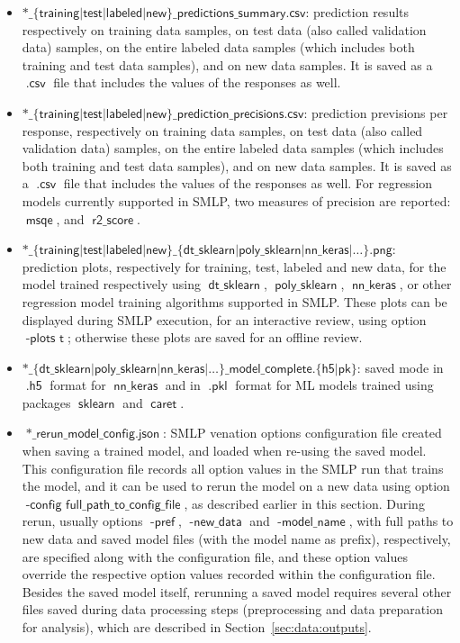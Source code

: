 \documentclass[a4paper,parskip=half]{article} %
\newcommand*\option[1]{\operatorname{\mathsf{#1}}} %
\newcommand*\suffix[1]{\operatorname{\mathsf{#1}}} %
\newcommand*\package[1]{\operatorname{\mathsf{#1}}} %
\newcommand*\precision[1]{\operatorname{\mathsf{#1}}} %
\newcommand*\model[1]{\operatorname{\mathsf{#1}}} %
\begin{document}
\begin{itemize}
\item $\suffix{*\_\{training|test|labeled|new\}\_predictions\_summary.csv}$: prediction results respectively on 
training data samples, on test data (also called validation data) samples, on the entire labeled data samples
(which includes both training and test data samples), and on new data samples. It is saved as a $\suffix{.csv}$ 
file that includes the values of the responses as well.
\item $\suffix{*\_\{training|test|labeled|new\}\_prediction\_precisions.csv}$: prediction previsions per response, 
respectively on 
training data samples, on test data (also called validation data) samples, on the entire labeled data samples
(which includes both training and test data samples), and on new data samples. It is saved as a $\suffix{.csv}$ 
file that includes the values of the responses as well. For regression models currently supported in SMLP, 
 two measures of precision are reported: $\precision{msqe}$, and $\precision{r2\_score}$.
\item $\suffix{*\_\{training|test|labeled|new\}\_\{dt\_sklearn|poly\_sklearn|nn\_keras|\ldots\}.png}$: prediction plots,
respectively for training, test, labeled and new data, for the model trained respectively using 
$\model{dt\_sklearn}$, $\model{poly\_sklearn}$, $\model{nn\_keras}$, 
or other regression model training algorithms supported in SMLP. These plots can be displayed during SMLP
execution, for an interactive review, using option $\option{-plots\,\,t}$; otherwise these plots are saved
for an offline review. 
\item $\suffix{*\_\{dt\_sklearn|poly\_sklearn|nn\_keras|\ldots\}\_model\_complete.\{h5|pk\}}$: saved mode
in $\suffix{.h5}$ format for $\model{nn\_keras}$ and in  $\suffix{.pkl}$ format for ML models trained 
using packages $\package{sklearn}$ and $\package{caret}$.
\item $\suffix{*\_rerun\_model\_config.json}$: SMLP venation options configuration file created when saving 
a trained model, and loaded when re-using the saved model. This configuration file records all option values in the 
SMLP run that trains the model, and it can be used to rerun the model on a new data using option 
$\option{-config\,\,full\_path\_to\_config\_file}$, as described earlier in this section. During rerun, usually
options $\option{-pref}$, $\option{-new\_data}$ and $\option{-model\_name}$, with full paths to new data 
and saved model files (with the model name as prefix), respectively, are specified along with the configuration file, 
and these option values override the respective option values recorded within the configuration file.
Besides the saved model itself, rerunning a saved model requires several other files saved during data processing
steps (preprocessing and data preparation for analysis), which are described in Section~\ref{sec:data:outputs}.  
\end{itemize}
\end{document}
